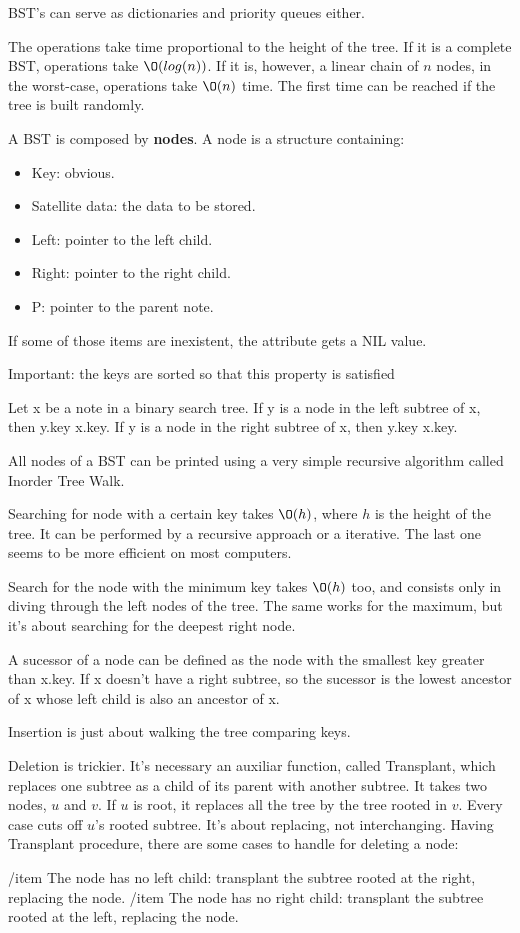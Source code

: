 BST's can serve as dictionaries and priority queues either.

The operations take time proportional to the height of the tree. If it is a complete BST, operations take $\O(log (n))$.  If it is, however, a linear chain of $n$ nodes, in the worst-case, operations take $\O(n)$ time. The first time can be reached if the tree is built randomly.

A BST is composed by \textbf{nodes}. A node is a structure containing:
\begin{itemize}
	\item Key: obvious.
	\item Satellite data: the data to be stored.
	\item Left: pointer to the left child.
	\item Right: pointer to the right child.
	\item P: pointer to the parent note.
\end{itemize}

If some of those items are inexistent, the attribute gets a NIL value.

Important: the keys are sorted so that this property is satisfied

Let x be a note in a binary search tree. If y is a node in the left subtree of x,
then y.key \le x.key. If y is a node in the right subtree of x, then
y.key \ge x.key.

All nodes of a BST can be printed using a very simple recursive algorithm called Inorder Tree Walk.

Searching for node with a certain key takes $\O(h)$, where $h$ is the height of the tree. It can be performed by a recursive approach or a iterative. The last one seems to be more
efficient on most computers.

Search for the node with the minimum key takes $\O(h)$ too, and consists only in diving through the left nodes of the tree. The same works for the maximum, but it's about searching for the deepest right node.

A sucessor of a node can be defined as the node with the smallest key greater than x.key. If x doesn't have a right subtree, so the sucessor is the lowest ancestor of x whose left child is also an ancestor of x.

Insertion is just about walking the tree comparing keys.

Deletion is trickier. It's necessary an auxiliar function, called Transplant, which replaces one subtree as a child of its parent with another subtree.
It takes two nodes, $u$ and $v$. If $u$ is root, it replaces all the tree by the tree rooted in $v$.
Every case cuts off $u$'s rooted subtree. It's about replacing, not interchanging.
Having Transplant procedure, there are some cases to handle for deleting a node:
\begin{itemize}
	/item The node has no left child: transplant the subtree rooted at the right, replacing the node.
	/item The node has no right child: transplant the subtree rooted at the left, replacing the node.
\end{itemize}
